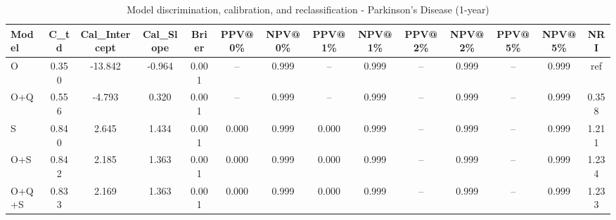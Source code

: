 \begin{table}[htbp]
\centering
\small
\caption{Model discrimination, calibration, and reclassification - Parkinson's Disease (1-year)}
\label{tab:perf_pd_1y}
\begin{tabular}{lccccccccccccc}
\toprule
Model & C\_td & Cal\_Intercept & Cal\_Slope & Brier & PPV@0\% & NPV@0\% & PPV@1\% & NPV@1\% & PPV@2\% & NPV@2\% & PPV@5\% & NPV@5\% & NRI \\
\midrule
O & 0.350 & -13.842 & -0.964 & 0.001 & -- & 0.999 & -- & 0.999 & -- & 0.999 & -- & 0.999 & ref \\
O+Q & 0.556 & -4.793 & 0.320 & 0.001 & -- & 0.999 & -- & 0.999 & -- & 0.999 & -- & 0.999 & 0.358 \\
S & 0.840 & 2.645 & 1.434 & 0.001 & 0.000 & 0.999 & 0.000 & 0.999 & -- & 0.999 & -- & 0.999 & 1.211 \\
O+S & 0.842 & 2.185 & 1.363 & 0.001 & 0.000 & 0.999 & 0.000 & 0.999 & -- & 0.999 & -- & 0.999 & 1.234 \\
O+Q+S & 0.833 & 2.169 & 1.363 & 0.001 & 0.000 & 0.999 & 0.000 & 0.999 & -- & 0.999 & -- & 0.999 & 1.233 \\
\bottomrule
\end{tabular}
\end{table}